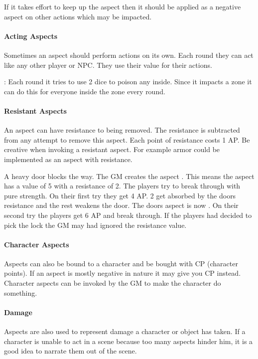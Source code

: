 \documentclass[11pt]{article}
\begin{document}
{If it takes effort to keep up the aspect then it should be applied as a negative aspect on other actions which may be impacted.
\paragraph*{Acting Aspects}
\label{sec:org62cedbe}

Sometimes an aspect should perform actions on its own. Each round they can act like any other player or NPC. They use their value for their actions.

\begin{pwexample}
: Each round it tries to use 2 dice to poison any inside. Since it impacts a zone it can do this for everyone inside the zone every round.
\end{pwexample}
\paragraph*{Resistant Aspects}
\label{sec:org647b490}
An aspect can have resistance to being removed. The resistance is subtracted from any attempt to remove this aspect. Each point of resistance costs 1 AP. Be creative when invoking a resistant aspect. For example armor could be implemented as an aspect with resistance.

\begin{pwexample}
A heavy door blocks the way. The GM creates the aspect . This means the aspect has a value of 5 with a resistance of 2. The players try to break through with pure strength. On their first try they get 4 AP. 2 get absorbed by the doors resistance and the rest weakens the door. The doors aspect is now . On their second try the players get 6 AP and break through.
If the players had decided to pick the lock the GM may had ignored the resistance value.
\end{pwexample}
\paragraph*{Character Aspects}
\label{sec:orge07db17}

Aspects can also be bound to a character and be bought with CP (character points). If an aspect is mostly negative in nature it may give you CP instead. Character aspects can be invoked by the GM to make the character do something. 
\paragraph*{Damage}
\label{sec:orgddf9948}
Aspects are also used to represent damage a character or object has taken. If a character is unable to act in a scene because too many aspects hinder him, it is a good idea to narrate them out of the scene.

}
\end{document}

